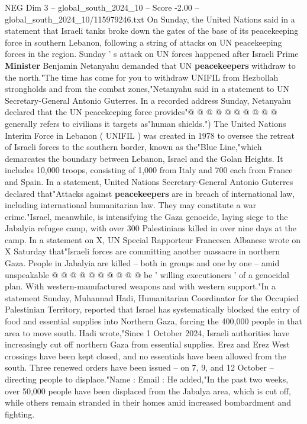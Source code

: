 \begin{textsample}{NEG Dim 3 – global\_south\_2024\_10 – Score -2.00 – global\_south\_2024\_10/115979246.txt}
On Sunday, the United Nations said in a statement that Israeli tanks broke down the gates of the base of its peacekeeping force in southern Lebanon, following a string of attacks on UN peacekeeping forces in the region.
Sunday ' s attack on UN forces happened after Israeli Prime \textbf{Minister} Benjamin Netanyahu demanded that UN \textbf{peacekeepers} withdraw to the north."The time has come for you to withdraw UNIFIL from Hezbollah strongholds and from the combat zones,"Netanyahu said in a statement to UN Secretary-General Antonio Guterres.
In a recorded address Sunday, Netanyahu declared that the UN peacekeeping force provides"@ @ @ @ @ @ @ @ @ @ generally refers to civilians it targets as"human shields.") The United Nations Interim Force in Lebanon ( UNIFIL ) was created in 1978 to oversee the retreat of Israeli forces to the southern border, known as the"Blue Line,"which demarcates the boundary between Lebanon, Israel and the Golan Heights.
It includes 10,000 troops, consisting of 1,000 from Italy and 700 each from France and Spain.
In a statement, United Nations Secretary-General Antonio Guterres declared that"Attacks against \textbf{peacekeepers} are in breach of international law, including international humanitarian law.
They may constitute a war crime."Israel, meanwhile, is intensifying the Gaza genocide, laying siege to the Jabalyia refugee camp, with over 300 Palestinians killed in over nine days at the camp.
In a statement on X, UN Special Rapporteur Francesca Albanese wrote on X Saturday that"Israeli forces are committing another massacre in northern Gaza.
People in Jabalyia are killed -- both in groups and one by one -- amid unspeakable @ @ @ @ @ @ @ @ @ @ be ' willing executioners ' of a genocidal plan.
With western-manufactured weapons and with western support."In a statement Sunday, Muhannad Hadi, Humanitarian Coordinator for the Occupied Palestinian Territory, reported that Israel has systematically blocked the entry of food and essential supplies into Northern Gaza, forcing the 400,000 people in that area to move south.
Hadi wrote,"Since 1 October 2024, Israeli authorities have increasingly cut off northern Gaza from essential supplies.
Erez and Erez West crossings have been kept closed, and no essentials have been allowed from the south.
Three renewed orders have been issued -- on 7, 9, and 12 October -- directing people to displace."Name : Email : He added,"In the past two weeks, over 50,000 people have been displaced from the Jabalya area, which is cut off, while others remain stranded in their homes amid increased bombardment and fighting.

\end{textsample}
